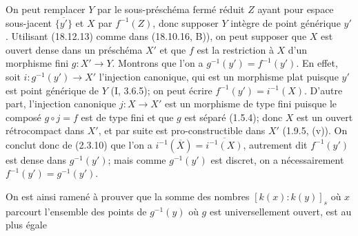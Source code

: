 On peut remplacer $Y$ par le sous-préschéma fermé réduit $Z$ ayant pour espace sous-jacent $\overline{\{y'\}}$ et $X$ par $f^{-1}(Z)$, donc supposer $Y$ intègre de point générique $y'$. Utilisant (18.12.13) comme dans (18.10.16, B)), on peut supposer que $X$ est ouvert dense dans un préschéma $X'$ et que $f$ est la restriction à $X$ d'un morphisme fini $g:X'\to Y$. Montrons que l'on a $g^{-1}(y')=f^{-1}(y')$. En effet, soit $i:g^{-1}(y')\to X'$ l'injection canonique, qui est un morphisme plat puisque $y'$ est point générique de $Y$ (I, 3.6.5); on peut écrire $f^{-1}(y')=i^{-1}(X)$. D'autre part, l'injection canonique $j:X\to X'$ est un morphisme de type fini puisque le composé $g\circ j=f$ est de type fini et que $g$ est séparé (1.5.4); donc $X$ est un ouvert rétrocompact dans $X'$, et par suite est pro-constructible dans $X'$ (1.9.5, (v)). On conclut donc de (2.3.10) que l'on a $i^{-1}(\overline{X})=\overline{i^{-1}(X)}$, autrement dit $f^{-1}(y')$ est dense dans $g^{-1}(y')$; mais comme $g^{-1}(y')$ est discret, on a nécessairement $f^{-1}(y')=g^{-1}(y')$.

On est ainsi ramené à prouver que la somme des nombres $[k(x):k(y)]_s$ où $x$ parcourt l'ensemble des points de $g^{-1}(y)$ où $g$ est universellement ouvert, est au plus égale

